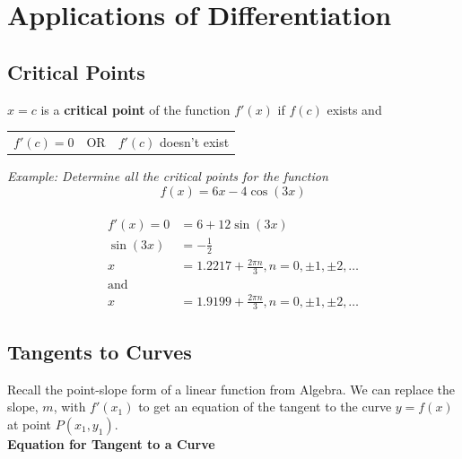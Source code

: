 \section{Applications of Differentiation}

    \subsection{Critical Points}
        $x=c$ is a \textbf{critical point} of the function $f'(x)$ if $f(c)$ exists and \\

        \begin{center}
            \begin{tabular}{ccc}
                $f'(c) = 0$ & OR & $f'(c)$ doesn't exist
            \end{tabular}
        \end{center}

        \noindent \color{blue} \textit{Example: Determine all the critical points for the function} \\

        \begin{equation*}
            f(x) = 6x - 4\cos{(3x)}
        \end{equation*} \color{black} \\

        \begin{align*}
            f'(x) = 0 &= 6 + 12\sin{(3x)} \\
            \sin{(3x)} &= -\frac{1}{2} \\
            x &= 1.2217+\frac{2\pi n}{3}, n=0,\pm 1,\pm 2,\dots \\
            \text{and} \\
            x &= 1.9199+\frac{2\pi n}{3}, n=0,\pm 1,\pm 2,\dots
        \end{align*}


    \subsection{Tangents to Curves}
        Recall the point-slope form of a linear function from Algebra. We can replace the slope,
        $m$, with $f'(x_1)$ to get an equation of the tangent to the curve $y=f(x)$ at point
        $P(x_1,y_1)$. \\

        \noindent \color{purple} \textbf{Equation for Tangent to a Curve} \color{black} \\

